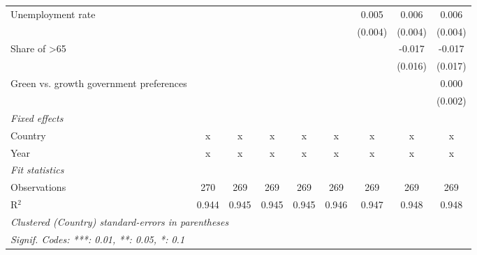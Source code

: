 \begin{table}[htbp]
\begin{tabular}{lcccccccc}
      Unemployment rate                                             &         &         &         &         &         & 0.005   & 0.006   & 0.006\\   
                                                                    &         &         &         &         &         & (0.004) & (0.004) & (0.004)\\   
      Share of >65                                                  &         &         &         &         &         &         & -0.017  & -0.017\\   
                                                                    &         &         &         &         &         &         & (0.016) & (0.017)\\   
      Green vs. growth government preferences                       &         &         &         &         &         &         &         & 0.000\\   
                                                                    &         &         &         &         &         &         &         & (0.002)\\   
      \emph{Fixed effects}\\
      Country                                                       & x       & x       & x       & x       & x       & x       & x       & x\\  
      Year                                                          & x       & x       & x       & x       & x       & x       & x       & x\\  
      \midrule \emph{Fit statistics}\\
      Observations                                                  & 270     & 269     & 269     & 269     & 269     & 269     & 269     & 269\\  
      R$^2$                                                         & 0.944   & 0.945   & 0.945   & 0.945   & 0.946   & 0.947   & 0.948   & 0.948\\  
      \midrule
      \multicolumn{9}{l}{\emph{Clustered (Country) standard-errors in parentheses}}\\
      \multicolumn{9}{l}{\emph{Signif. Codes: ***: 0.01, **: 0.05, *: 0.1}}\\
   \end{tabular}
\end{table}



